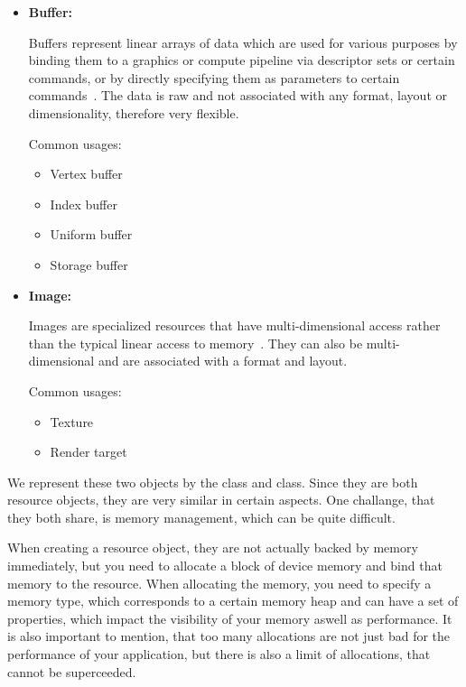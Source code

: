 \begin{itemize}
    \item \textbf{Buffer:}
    
    Buffers represent linear arrays of data which are used for various purposes by binding them to a graphics or compute pipeline via descriptor sets or certain commands, or by directly specifying them as parameters to certain commands~\parencite{vulkan-spec-resources}. The data is raw and not associated with any format, layout or dimensionality, therefore very flexible.

    Common usages:
    \begin{itemize}
        \item Vertex buffer
        \item Index buffer
        \item Uniform buffer
        \item Storage buffer
    \end{itemize}

    \item \textbf{Image:}

    Images are specialized resources that have multi-dimensional access rather than the typical linear access to memory~\parencite{vulkan-spec-images}. They can also be multi-dimensional and are associated with a format and layout.
    
    Common usages:
    \begin{itemize}
        \item Texture
        \item Render target
    \end{itemize}
\end{itemize}

We represent these two objects by the  class and  class. Since they are both resource objects, they are very similar in certain aspects. One challange, that they both share, is memory management, which can be quite difficult.

When creating a resource object, they are not actually backed by memory immediately, but you need to allocate a block of device memory and bind that memory to the resource. When allocating the memory, you need to specify a memory type, which corresponds to a certain memory heap and can have a set of properties, which impact the visibility of your memory aswell as performance. It is also important to mention, that too many allocations are not just bad for the performance of your application, but there is also a limit of allocations, that cannot be superceeded.

